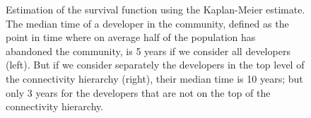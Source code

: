 \begin{figure}[H]
\centering
{}
\hspace{.01in}
\label{fig:survival}
\caption[Survival function using the Kaplan-Meier estimate.]{Estimation of the survival function using the Kaplan-Meier estimate. The median time of a developer in the community, defined as the point in time where on average half of the population has abandoned the community, is 5 years if we consider all developers (left). But if we consider separately the developers in the top level of the connectivity hierarchy (right), their median time is 10 years; but only 3 years for the developers that are not on the top of the connectivity hierarchy.}
\end{figure}

